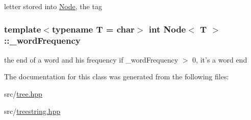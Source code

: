 letter stored into \hyperlink{class_node}{Node}, the tag 

\hypertarget{class_node_add728cb28da68ec5ef2d9cac31c9a08d}{
\subsubsection[{\-\_\-word\-Frequency}]{\setlength{\rightskip}{0pt plus 5cm}template$<$typename T = char$>$ int {\bf Node}$<$ T $>$\-::\-\_\-word\-Frequency\hspace{0.3cm}{\ttfamily [private]}}}\label{class_node_add728cb28da68ec5ef2d9cac31c9a08d}
the end of a word and his frequency if \-\_\-word\-Frequency $>$ 0, it's a word end 

The documentation for this class was generated from the following files\-:\begin{DoxyCompactItemize}
\item 
src/\hyperlink{tree_8hpp}{tree.\-hpp}\item 
src/\hyperlink{treestring_8hpp}{treestring.\-hpp}\end{DoxyCompactItemize}
